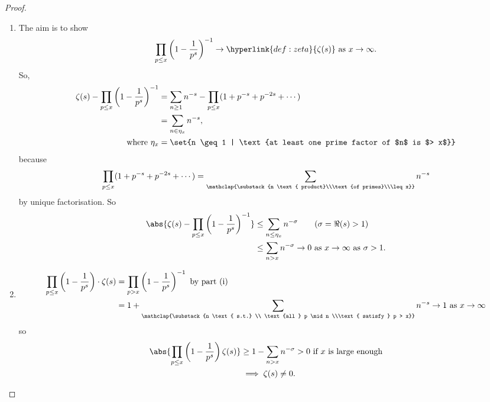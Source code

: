 \documentclass{article}
\begin{document}
\begin{proof}\leavevmode
    \begin{enumerate}[label=(\roman*)]
        \item The aim is to show
            \begin{equation*}
                \prod_{p \leq x} \left(1 - \frac{1}{p^s}\right)^{-1} \to \hyperlink{def:zeta}{\zeta(s)} \text{ as } x \to \infty.
            \end{equation*}
            So,
            \begin{align*}
                \zeta(s) - \prod_{p \leq x} \left(1 - \frac{1}{p^s}\right)^{-1} &= \sum_{n \geq 1} n^{-s} - \prod_{p \leq x} (1 + p^{-s} + p^{-2s} + \dotsb) \\
                                                                                &= \sum_{n \in \eta_x} n^{-s}, \\
                \text{where } \eta_x &= \set{n \geq 1 | \text{at least one prime factor of $n$ is $> x$}}
            \end{align*}
            because \begin{equation*}\prod_{p \leq x} (1 + p^{-s} + p^{-2s} + \dotsb) = \sum_{\mathclap{\substack{n \text{ product}\\\text{of primes}\\\leq x}}} n^{-s}\end{equation*} by unique factorisation.
            So
            \begin{align*}
                \abs{\zeta(s) - \prod_{p \leq x} \left(1 - \frac{1}{p^s}\right)^{-1}} &\leq \sum_{n \leq \eta_x} n^{-\sigma} \tag{$\sigma = \Re(s) > 1$} \\
                                                                                      &\leq \sum_{n > x} n^{-\sigma} \to 0 \text{ as } x \to \infty \text{ as } \sigma > 1.
            \end{align*}
        \item
            \begin{align*}
                \prod_{p \leq x} \left(1 - \frac{1}{p^s}\right) \cdot \zeta(s) &= \prod_{p > x} \left(1 - \frac{1}{p^s}\right)^{-1} \text{ by part (i)} \\
                                                                               &= 1 + \sum_{\mathclap{\substack{n \text{ s.t.} \\ \text{all } p \mid n \\\text{ satisfy } p > x}}} n^{-s} \to 1 \text{ as } x \to \infty
            \end{align*}
            so
            \begin{align*}
                \abs{\prod_{p \leq x} \left(1 - \frac{1}{p^s}\right) \zeta(s)} &\geq 1 - \sum_{n > x} n^{-\sigma} > 0 \text{ if $x$ is large enough} \\
                                                                               &\implies \zeta(s) \neq 0. \qedhere
            \end{align*}
    \end{enumerate}
\end{proof}
\end{document}
